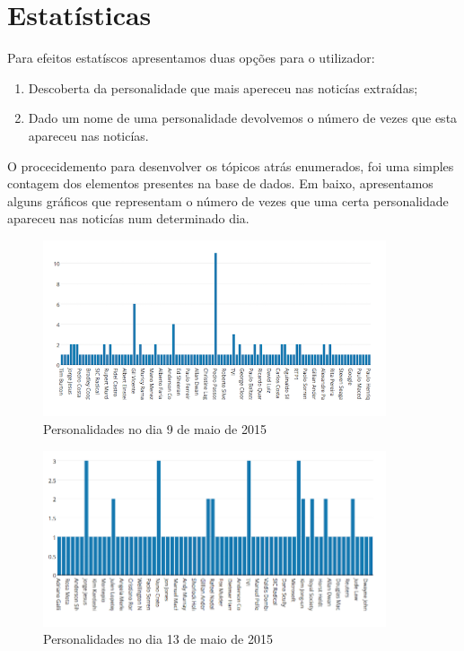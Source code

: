 \section{Estatísticas}

Para efeitos estatíscos apresentamos duas opções para o utilizador:

\begin{enumerate}
  \item Descoberta da personalidade que mais apereceu nas noticías extraídas;
  \item Dado um nome de uma personalidade devolvemos o número de vezes que esta apareceu nas noticías.
\end{enumerate}

O procecidemento para desenvolver os tópicos atrás enumerados, foi uma simples contagem dos elementos presentes na base de dados. Em baixo, apresentamos alguns gráficos que representam o número de vezes que uma certa personalidade apareceu nas noticías num determinado dia.

\begin{figure}[htbp]
  \centering
    \includegraphics[width=0.9\textwidth]{images/day_one.png}
	\caption{Personalidades no dia 9 de maio de 2015}
\end{figure}

\begin{figure}[htbp]
  \centering
    \includegraphics[width=0.9\textwidth]{images/day_two.png}
	\caption{Personalidades no dia 13 de maio de 2015}
\end{figure}

